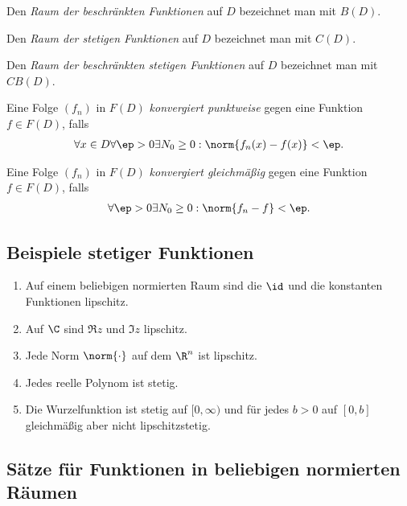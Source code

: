 \begin{defn}
Den \emph{Raum der beschränkten Funktionen} auf $D$ bezeichnet man mit
\emph{$B(D)$}.
\end{defn}
\begin{defn}
Den \emph{Raum der stetigen Funktionen} auf $D$ bezeichnet man mit
\emph{$C(D)$}.
\end{defn}
\begin{defn}
Den \emph{Raum der beschränkten stetigen Funktionen} auf $D$ bezeichnet man mit
\emph{$CB(D)$}.
\end{defn}
\begin{defn}
Eine Folge $(f_n)$ in $F(D)$ \emph{konvergiert punktweise} gegen eine Funktion
$f\in F(D)$, falls
\begin{align*}
\forall x \in D \forall \ep > 0 \exists N_0 \ge 0 : \norm{f_n(x)-f(x)} <
\ep.
\end{align*}
\end{defn}
\begin{defn}
Eine Folge $(f_n)$ in $F(D)$ \emph{konvergiert gleichmäßig} gegen eine Funktion
$f\in F(D)$, falls
\begin{align*}
\forall \ep > 0 \exists N_0 \ge 0 : \norm{f_n - f} < \ep.
\end{align*}
\end{defn}

\subsection{Beispiele stetiger Funktionen}

\begin{enumerate}
  \item Auf einem beliebigen normierten Raum sind die $\id$ und die konstanten
Funktionen lipschitz.
  \item Auf $\C$ sind $\Re z$ und $\Im z$ lipschitz.
  \item Jede Norm $\norm{\cdot}$ auf dem $\R^n$ ist lipschitz.
  \item Jedes reelle Polynom ist stetig.
  \item Die Wurzelfunktion ist stetig auf $[0,\infty)$ und für jedes $b>0$ auf
  $[0,b]$ gleichmäßig aber nicht lipschitzstetig.
\end{enumerate}

\subsection{Sätze für Funktionen in beliebigen normierten Räumen}

